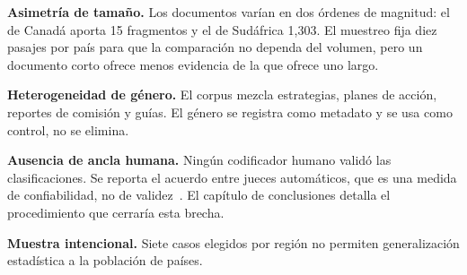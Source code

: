 \textbf{Asimetría de tamaño.} Los documentos varían en dos órdenes de magnitud: el de Canadá aporta 15 fragmentos y el de Sudáfrica 1{,}303. El muestreo fija diez pasajes por país para que la comparación no dependa del volumen, pero un documento corto ofrece menos evidencia de la que ofrece uno largo.

\textbf{Heterogeneidad de género.} El corpus mezcla estrategias, planes de acción, reportes de comisión y guías. El género se registra como metadato y se usa como control, no se elimina.

\textbf{Ausencia de ancla humana.} Ningún codificador humano validó las clasificaciones. Se reporta el acuerdo entre jueces automáticos, que es una medida de confiabilidad, no de validez~\citep{halterman2025codebook}. El capítulo de conclusiones detalla el procedimiento que cerraría esta brecha.

\textbf{Muestra intencional.} Siete casos elegidos por región no permiten generalización estadística a la población de países.
